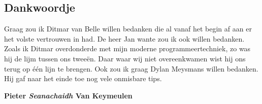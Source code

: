 \documentclass[11pt,a4paper]{article}
\begin{document}
\subsection{Dankwoordje}
Graag zou ik Ditmar van Belle willen bedanken die al vanaf het begin af aan er het volste vertrouwen in had. De heer Jan wante zou ik ook willen bedanken. Zoals ik Ditmar overdonderde met mijn moderne programmeertechniek, zo was hij de lijm tussen ons tweeën. Daar waar wij niet overeenkwamen wist hij ons terug op één lijn te brengen. Ook zou ik graag Dylan Meysmans willen bedanken. Hij gaf naar het einde toe nog vele onmisbare tips.

\begin{flushright}
\textbf{Pieter \emph{Seanachaidh} Van Keymeulen}
\end{flushright}
\end{document}
